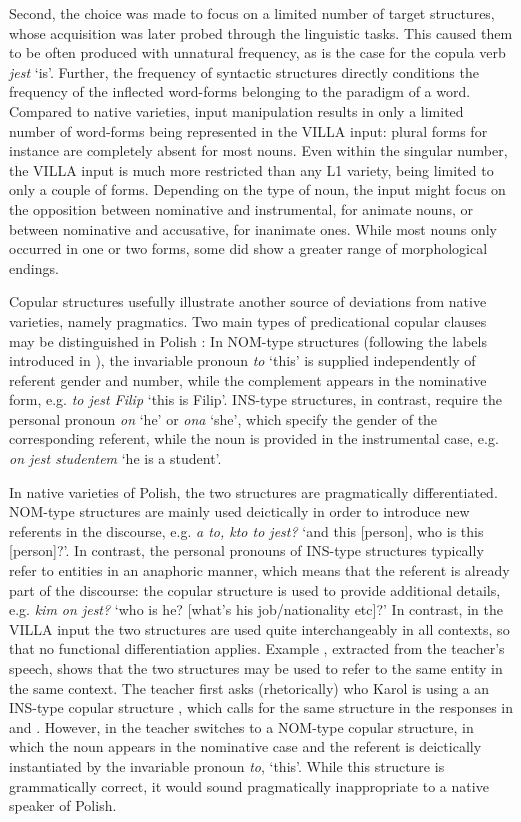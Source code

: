 Second, the choice was made to focus on a limited number of target structures, whose acquisition was later probed through the linguistic tasks. This caused them to be often produced with unnatural frequency, as is the case for the copula verb \textit{jest} ‘is’. Further, the frequency of syntactic structures directly conditions the frequency of the inflected word-forms belonging to the paradigm of a word. Compared to native varieties, input manipulation results in only a limited number of word-forms being represented in the VILLA input: plural forms for instance are completely absent for most nouns. Even within the singular number, the VILLA input is much more restricted than any L1 variety, being limited to only a couple of forms. Depending on the type of noun, the input might focus on the opposition between nominative and instrumental, for animate nouns, or between nominative and accusative, for inanimate ones. While most nouns only occurred in one or two forms, some did show a greater range of morphological endings. 

Copular structures usefully illustrate another source of deviations from native varieties, namely pragmatics. Two main types of predicational copular clauses may be distinguished in Polish \citep{Bondaruk2013}: In NOM-type structures (following the labels introduced in \citealt{Saturno2015}), the invariable pronoun \textit{to} ‘this’ is supplied independently of referent gender and number, while the complement appears in the nominative form, e.g. \textit{to jest Filip} ‘this is Filip’. INS-type structures, in contrast, require the personal pronoun \textit{on} ‘he’ or \textit{ona} ‘she’, which specify the gender of the corresponding referent, while the noun is provided in the instrumental case, e.g. \textit{on jest studentem} ‘he is a student’.

In native varieties of Polish, the two structures are pragmatically differentiated. NOM-type structures are mainly used deictically in order to introduce new referents in the discourse, e.g. \textit{a to, kto to jest?} ‘and this [person], who is this [person]?’. In contrast, the personal pronouns of INS-type structures typically refer to entities in an anaphoric manner, which means that the referent is already part of the discourse: the copular structure is used to provide additional details, e.g. \textit{kim on jest?} ‘who is he? [what's his job/nationality etc]?’ In contrast, in the VILLA input the two structures are used quite interchangeably in all contexts, so that no functional differentiation applies. Example , extracted from the teacher's speech, shows that the two structures may be used to refer to the same entity in the same context. The teacher first asks (rhetorically) who Karol is using a an INS-type copular structure , which calls for the same structure in the responses in  and . However, in  the teacher switches to a NOM-type copular structure, in which the noun appears in the nominative case and the referent is deictically instantiated by the invariable pronoun \textit{to}, ‘this’. While this structure is grammatically correct, it would sound pragmatically inappropriate to a native speaker of Polish.


